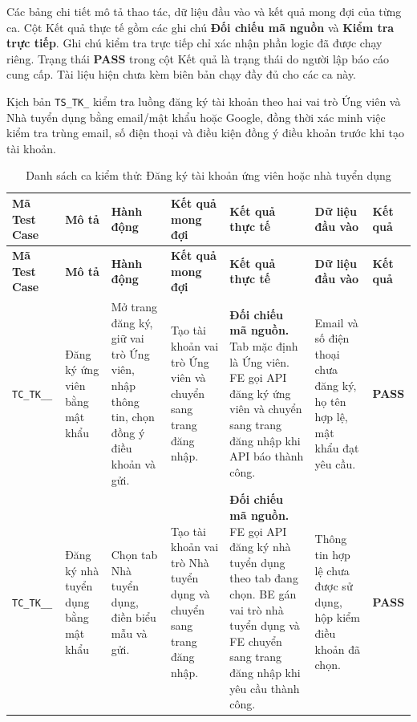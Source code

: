 \begin{landscape}

Các bảng chi tiết mô tả thao tác, dữ liệu đầu vào và kết quả mong đợi của từng ca. Cột Kết quả thực tế gồm các ghi chú \textbf{Đối chiếu mã nguồn} và \textbf{Kiểm tra trực tiếp}. Ghi chú kiểm tra trực tiếp chỉ xác nhận phần logic đã được chạy riêng. Trạng thái \textbf{PASS} trong cột Kết quả là trạng thái do người lập báo cáo cung cấp. Tài liệu hiện chưa kèm biên bản chạy đầy đủ cho các ca này.

Kịch bản \texttt{TS\_\allowbreak TK\_} kiểm tra luồng đăng ký tài khoản theo hai vai trò Ứng viên và Nhà tuyển dụng bằng email/mật khẩu hoặc Google, đồng thời xác minh việc kiểm tra trùng email, số điện thoại và điều kiện đồng ý điều khoản trước khi tạo tài khoản.

{
\fontsize{9.5}{11.5}\selectfont
\setlength{\tabcolsep}{3pt}
\renewcommand{\arraystretch}{1.2}
\begin{longtable}{|>{\raggedright\arraybackslash}p{2.1cm}|>{\raggedright\arraybackslash}p{2.8cm}|>{\raggedright\arraybackslash}p{3.8cm}|>{\raggedright\arraybackslash}p{4.0cm}|>{\raggedright\arraybackslash}p{5.0cm}|>{\raggedright\arraybackslash}p{3.2cm}|>{\centering\arraybackslash}p{1.3cm}|}
    \caption{Danh sách ca kiểm thử: Đăng ký tài khoản ứng viên hoặc nhà tuyển dụng} \label{tab:ts-tk-01} \\
    \hline
    \textbf{Mã Test Case} & \textbf{Mô tả} & \textbf{Hành động} & \textbf{Kết quả mong đợi} & \textbf{Kết quả thực tế} & \textbf{Dữ liệu đầu vào} & \textbf{Kết quả} \\
    \hline
    \endfirsthead
    \hline
    \textbf{Mã Test Case} & \textbf{Mô tả} & \textbf{Hành động} & \textbf{Kết quả mong đợi} & \textbf{Kết quả thực tế} & \textbf{Dữ liệu đầu vào} & \textbf{Kết quả} \\
    \hline
    \endhead
    \hline
    \endfoot
    \hline
    \endlastfoot
    \texttt{TC\_\allowbreak TK\_\allowbreak 01\_\allowbreak 01} & Đăng ký ứng viên bằng mật khẩu & Mở trang đăng ký, giữ vai trò Ứng viên, nhập thông tin, chọn đồng ý điều khoản và gửi. & Tạo tài khoản vai trò Ứng viên và chuyển sang trang đăng nhập. & \textbf{Đối chiếu mã nguồn.} Tab mặc định là Ứng viên. FE gọi API đăng ký ứng viên và chuyển sang trang đăng nhập khi API báo thành công. & Email và số điện thoại chưa đăng ký, họ tên hợp lệ, mật khẩu đạt yêu cầu. & \textbf{PASS} \\
    \hline
    \texttt{TC\_\allowbreak TK\_\allowbreak 01\_\allowbreak 02} & Đăng ký nhà tuyển dụng bằng mật khẩu & Chọn tab Nhà tuyển dụng, điền biểu mẫu và gửi. & Tạo tài khoản vai trò Nhà tuyển dụng và chuyển sang trang đăng nhập. & \textbf{Đối chiếu mã nguồn.} FE gọi API đăng ký nhà tuyển dụng theo tab đang chọn. BE gán vai trò nhà tuyển dụng và FE chuyển sang trang đăng nhập khi yêu cầu thành công. & Thông tin hợp lệ chưa được sử dụng, hộp kiểm điều khoản đã chọn. & \textbf{PASS} \\

\end{longtable}}
\end{landscape}
